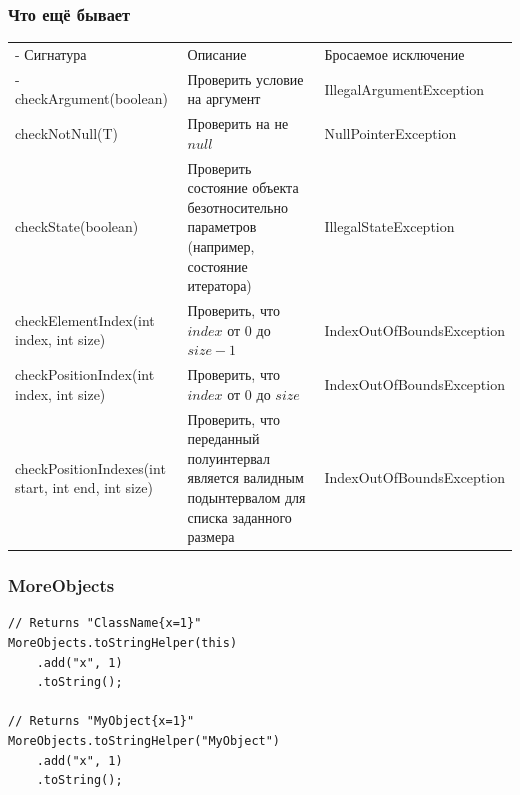 \documentclass[xetex,mathserif,serif]{beamer}
\begin{document}
	\begin{frame}
		\frametitle{Что ещё бывает}
		\begin{scriptsize}
			\begin{tabu} {| X[0.9 l p] | X[1 l p] | X[1 l p] |}
				\tabucline-
				Сигнатура                                          & Описание                                                                                            & Бросаемое исключение      \\
				\tabucline-
				\everyrow{\tabucline-}
				checkArgument(boolean)                             & Проверить условие на аргумент                                                                       & IllegalArgumentException  \\
				checkNotNull(T)                                    & Проверить на не $null$                                                                              & NullPointerException      \\
				checkState(boolean)                                & Проверить состояние объекта безотносительно параметров (например, состояние итератора)              & IllegalStateException     \\
				checkElementIndex(int index, int size)             & Проверить, что $index$ от $0$ до $size - 1$                                                         & IndexOutOfBoundsException \\
				checkPositionIndex(int index, int size)            & Проверить, что $index$ от $0$ до $size$                                                             & IndexOutOfBoundsException \\
				checkPositionIndexes(int start, int end, int size) & Проверить, что переданный полуинтервал является валидным подынтервалом для списка заданного размера & IndexOutOfBoundsException \\
			\end{tabu}
		\end{scriptsize}
	\end{frame}

	\begin{frame}[fragile]
		\frametitle{MoreObjects}
		\begin{verbatim}
// Returns "ClassName{x=1}"
MoreObjects.toStringHelper(this)
    .add("x", 1)
    .toString();

// Returns "MyObject{x=1}"
MoreObjects.toStringHelper("MyObject")
    .add("x", 1)
    .toString();
		\end{verbatim}
\end{frame}
\end{document}
